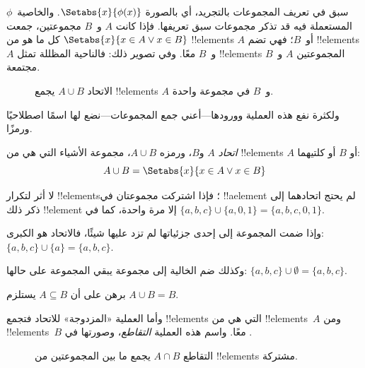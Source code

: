 \documentclass[../../../include/open-logic-section]{subfiles}
\begin{document}

\begin{explain}
سبق في  تعريف المجموعات بالتجريد، أي بالصورة
$\Setabs{x}{\phi(x)}$. والخاصية~$\phi$ المستعملة فيه قد تذكر مجموعات
سبق تعريفها. فإذا كانت $A$ و~$B$ مجموعتين، جمعت
$\Setabs{x}{x \in A \lor x \in B}$ كل ما هو من !!{element}s $A$ أو~$B$؛
فهي تضم !!{element}s $A$ و~$B$ معًا. وفي  تصوير ذلك:
فالناحية المظللة تمثل !!{element}s المجموعتين $A$ و~$B$ مجتمعة.

\begin{figure}
  \caption{الاتحاد $A \cup B$ يجمع !!{element}s $A$ و~$B$ في مجموعة واحدة.}
\end{figure}

ولكثرة نفع هذه العملية وورودها---أعني جمع المجموعات---نضع لها اسمًا
اصطلاحيًا ورمزًا.
\end{explain}

\begin{defn}[الاتحاد]
\emph{اتحاد} $A$ و$B$، ورمزه $A \cup B$، مجموعة الأشياء التي هي من !!{element}s $A$ أو $B$
أو كلتيهما:
\[
A \cup B = \Setabs{x}{x \in A \lor x \in B}
\]
\end{defn}

\begin{ex}
لا أثر لتكرار !!{element}s؛ فإذا اشتركت مجموعتان في !!a{element}
لم يحتج اتحادهما إلى ذكر ذلك !!{element} إلا مرة واحدة، كما في
$\{ a, b, c\} \cup \{ a, 0, 1\} = \{a, b, c, 0, 1\}$.

وإذا ضمت المجموعة إلى إحدى جزئياتها لم تزد عليها شيئًا، فالاتحاد
هو الكبرى: $\{a,
b, c \} \cup \{a \} = \{a, b, c\}$.

وكذلك ضم الخالية إلى مجموعة يبقي المجموعة على حالها: $\{a,
b, c \} \cup \emptyset = \{a, b, c \}$.
\end{ex}

\begin{prob}
برهن على أن $A \subseteq B$ يستلزم $A \cup B = B$.
\end{prob}

\begin{explain}
وأما العملية «المزدوجة» للاتحاد فتجمع !!{element}s التي هي من
!!{element}s~$A$ ومن !!{element}s~$B$ معًا. واسم هذه العملية
\emph{التقاطع}، وصورتها في .
\begin{figure}
  \caption{التقاطع $A \cap B$ يجمع ما بين المجموعتين من !!{element}s مشتركة.}
\end{figure}
\end{explain}
\end{document}
